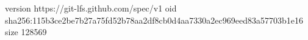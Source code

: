 version https://git-lfs.github.com/spec/v1
oid sha256:115b3ce2be7b27a75fd52b78aa2df8cb0d4aa7330a2ec969eed83a57703b1e16
size 128569
